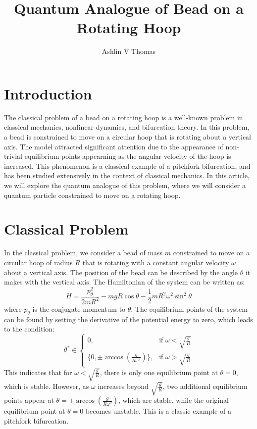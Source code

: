 \documentclass{article}
\title{Quantum Analogue of Bead on a Rotating Hoop}
\author{Ashlin V Thomas}
\date{}
\begin{document}
\maketitle
\section{Introduction}
The classical problem of a bead on a rotating hoop is a well-known problem in classical mechanics, nonlinear dynamics, and bifurcation theory. 
In this problem, a bead is constrained to move on a circular hoop that is rotating about a vertical axis. 
The model attracted significant attention due to the appearance of non-trivial equilibrium points appearning as the angular velocity of the hoop is increased.
This phenomenon is a classical example of a pitchfork bifurcation, and has been studied extensively in the context of classical mechanics.
In this article, we will explore the quantum analogue of this problem, where we will consider a quantum particle constrained to move on a rotating hoop.

\section{Classical Problem}
In the classical problem, we consider a bead of mass $m$ constrained to move on a circular hoop of radius $R$ that is rotating with a constant angular velocity $\omega$ about a vertical axis.
The position of the bead can be described by the angle $\theta$ it makes with the vertical axis. 
The Hamiltonian of the system can be written as:
\begin{equation}
H = \frac{p_\theta^2}{2mR^2} - mgR \cos\theta - \frac{1}{2} m R^2 \omega^2 \sin^2\theta \label{classical Hamiltonian}
\end{equation}
where $p_\theta$ is the conjugate momentum to $\theta$.
The equilibrium points of the system can be found by setting the derivative of the potential energy to zero, which leads to the condition:
\begin{equation}
    \theta^* \in  \begin{cases}
        0, & \text{if } \omega < \sqrt{\frac{g}{R}} \\
        \{ 0, \pm \arccos\left(\frac{g}{R\omega^2}\right) \}, & \text{if } \omega > \sqrt{\frac{g}{R}}
    \end{cases}
\end{equation}
This indicates that for $\omega < \sqrt{\frac{g}{R}}$, there is only one equilibrium point at $\theta = 0$, which is stable. 
However, as $\omega$ increases beyond $\sqrt{\frac{g}{R}}$, two additional equilibrium points appear at $\theta = \pm \arccos\left(\frac{g}{R\omega^2}\right)$, which are stable, while the original equilibrium point at $\theta = 0$ becomes unstable. 
This is a classic example of a pitchfork bifurcation.   
\end{document}
